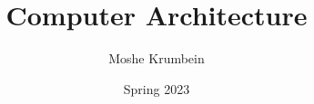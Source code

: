
\usepackage{subfiles}

\title{Computer Architecture}
\def \thecoursenum {67200}
\def \theinstructor {Ohad Falik and Ron Gabor}
\author{Moshe Krumbein}
\date{Spring 2023}





\setcounter{tocdepth}{2}
\tableofcontents
\cleardoublepage




